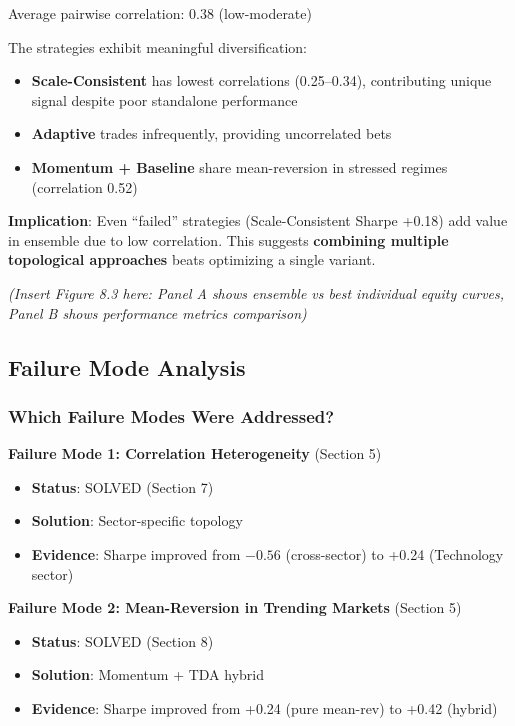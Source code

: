 Average pairwise correlation: 0.38 (low-moderate)

The strategies exhibit meaningful diversification:
\begin{itemize}
\item \textbf{Scale-Consistent} has lowest correlations (0.25--0.34), contributing unique signal despite poor standalone performance
\item \textbf{Adaptive} trades infrequently, providing uncorrelated bets
\item \textbf{Momentum + Baseline} share mean-reversion in stressed regimes (correlation 0.52)
\end{itemize}

\textbf{Implication}: Even ``failed'' strategies (Scale-Consistent Sharpe +0.18) add value in ensemble due to low correlation. This suggests \textbf{combining multiple topological approaches} beats optimizing a single variant.

\textit{(Insert Figure 8.3 here: Panel A shows ensemble vs best individual equity curves, Panel B shows performance metrics comparison)}

\subsection{Failure Mode Analysis}

\subsubsection{Which Failure Modes Were Addressed?}

\textbf{Failure Mode 1: Correlation Heterogeneity} (Section 5)
\begin{itemize}
\item \textbf{Status}: SOLVED (Section 7)
\item \textbf{Solution}: Sector-specific topology
\item \textbf{Evidence}: Sharpe improved from $-0.56$ (cross-sector) to +0.24 (Technology sector)
\end{itemize}

\textbf{Failure Mode 2: Mean-Reversion in Trending Markets} (Section 5)
\begin{itemize}
\item \textbf{Status}: SOLVED (Section 8)
\item \textbf{Solution}: Momentum + TDA hybrid
\item \textbf{Evidence}: Sharpe improved from +0.24 (pure mean-rev) to +0.42 (hybrid)
\end{itemize}


